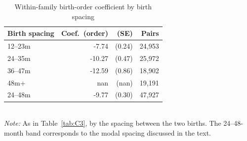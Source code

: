 \begin{table}[htbp]\centering
\caption{Within-family birth-order coefficient by birth spacing}
\label{tab:C3d}
\footnotesize
\setlength{\tabcolsep}{4pt}
\begin{tabular}{lrrr}
\toprule
Birth spacing & Coef.\ (order) & (SE) & Pairs \\
\midrule
12--23m & -7.74 & (0.24) & 24,953 \\
24--35m & -10.27 & (0.47) & 25,972 \\
36--47m & -12.59 & (0.86) & 18,902 \\
48m+ & nan & (nan) & 19,191 \\
24--48m & -9.77 & (0.30) & 47,927 \\
\bottomrule
\end{tabular}
\\[3pt]{\footnotesize \textit{Note:} As in Table~\ref{tab:C3}, by the spacing between the two births. The 24--48-month band corresponds to the modal spacing discussed in the text.}
\end{table}

